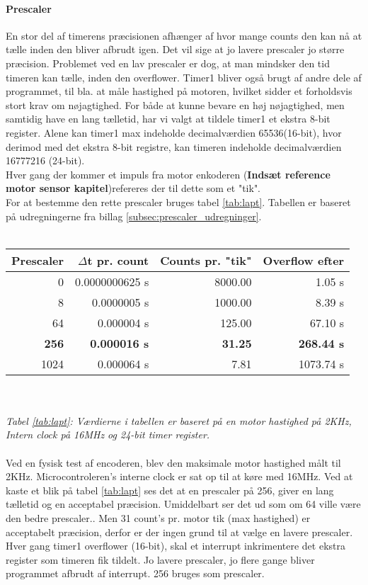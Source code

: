 \paragraph{Prescaler}
En stor del af timerens præcisionen afhænger af hvor mange counts den kan nå at tælle inden den bliver afbrudt igen. Det vil sige at jo lavere prescaler jo større præcision. Problemet ved en lav prescaler er dog, at man mindsker den tid timeren kan tælle, inden den overflower. Timer1 bliver også brugt af andre dele af programmet, til bla. at måle hastighed på motoren, hvilket sidder et forholdsvis stort krav om nøjagtighed. For både at kunne bevare en høj nøjagtighed, men samtidig have en lang tælletid, har vi valgt at tildele timer1 et ekstra 8-bit register. Alene kan timer1 max indeholde decimalværdien 65536(16-bit), hvor derimod med det ekstra 8-bit registre, kan timeren indeholde decimalværdien 16777216 (24-bit).\\
Hver gang der kommer et impuls fra motor enkoderen (\textbf{Indsæt reference motor sensor kapitel})refereres der til dette som et "tik".\\
For at bestemme den rette prescaler bruges tabel \ref{tab:lapt}. Tabellen er baseret på udregningerne fra billag \ref{subsec:prescaler_udregninger}.\\
\\
\begin{tabular}{ | r | r | r | r | }
	\hline
	Prescaler 		& $\Delta$t pr. count 	& Counts pr. "tik"	&	Overflow efter		\\
	\hline
	0 				& 	 	0.0000000625 s	&  		8000.00		&		1.05 s			\\
	\hline
	8 				& 	 	0.0000005 s		&  		1000.00		&		8.39 s			\\
	\hline
	64 				& 	 	0.000004 s		&  		125.00		&		67.10 s			\\
	\hline
	\textbf{256} 	& \textbf{0.000016 s}	&  	\textbf{31.25}	&	\textbf{268.44 s}	\\
	\hline
	1024 			& 	 	0.000064 s		&  		7.81		&		1073.74 s		\\
	\hline
\end{tabular}
\label{tab:lapt}
\\
\\
\textsl{\small Tabel \ref{tab:lapt}: Værdierne i tabellen er baseret på en motor hastighed på 2KHz, Intern clock på 16MHz og 24-bit timer register.}\\
\\
Ved en fysisk test af encoderen, blev den maksimale motor hastighed målt til 2KHz.
Microcontroleren's interne clock er sat op til at køre med 16MHz. Ved at kaste et blik på tabel \ref{tab:lapt} ses det at en prescaler på 256, giver en lang tælletid og en acceptabel præcision. Umiddelbart ser det ud som om 64 ville være den bedre prescaler..
Men 31 count's pr. motor tik (max hastighed) er acceptabelt præcision, derfor er der ingen grund til at vælge en lavere prescaler. Hver gang timer1 overflower (16-bit), skal et interrupt inkrimentere det ekstra register som timeren fik tildelt. Jo lavere prescaler, jo flere gange bliver programmet afbrudt af interrupt. 256 bruges som prescaler.

